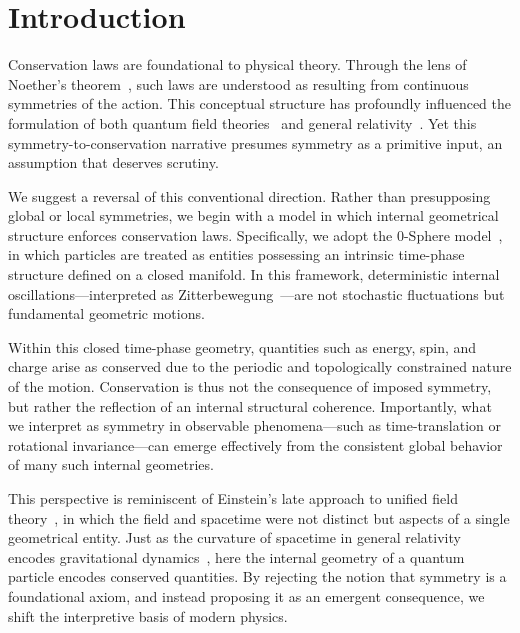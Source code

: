 \documentclass[%
 reprint,
 amsmath,amssymb,
 aps,
]{revtex4-1}
\numberwithin{equation}{section}%
\begin{document}
\maketitle

\section{Introduction}
Conservation laws are foundational to physical theory. Through the lens of Noether's theorem~\cite{noether1918}, such laws are understood as resulting from continuous symmetries of the action. This conceptual structure has profoundly influenced the formulation of both quantum field theories~\cite{weinberg1995} and general relativity~\cite{einstein1915}. Yet this symmetry-to-conservation narrative presumes symmetry as a primitive input, an assumption that deserves scrutiny.

We suggest a reversal of this conventional direction. Rather than presupposing global or local symmetries, we begin with a model in which internal geometrical structure enforces conservation laws. Specifically, we adopt the 0-Sphere model~\cite{hanamura2309.0047}, in which particles are treated as entities possessing an intrinsic time-phase structure defined on a closed manifold. In this framework, deterministic internal oscillations—interpreted as Zitterbewegung~\cite{dirac1928,schrodinger1930}—are not stochastic fluctuations but fundamental geometric motions.

Within this closed time-phase geometry, quantities such as energy, spin, and charge arise as conserved due to the periodic and topologically constrained nature of the motion. Conservation is thus not the consequence of imposed symmetry, but rather the reflection of an internal structural coherence. Importantly, what we interpret as symmetry in observable phenomena—such as time-translation or rotational invariance—can emerge effectively from the consistent global behavior of many such internal geometries.

This perspective is reminiscent of Einstein's late approach to unified field theory~\cite{einstein1955}, in which the field and spacetime were not distinct but aspects of a single geometrical entity. Just as the curvature of spacetime in general relativity encodes gravitational dynamics~\cite{misner1973}, here the internal geometry of a quantum particle encodes conserved quantities. By rejecting the notion that symmetry is a foundational axiom, and instead proposing it as an emergent consequence, we shift the interpretive basis of modern physics.
\end{document}
